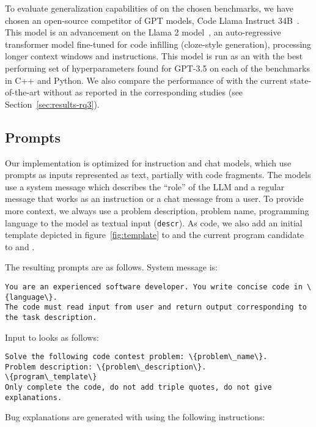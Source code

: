 To evaluate generalization capabilities of \method{} on the chosen benchmarks, we have chosen an open-source competitor of GPT models, Code Llama Instruct 34B~\cite{roziereCodeLlamaOpen2023}. 
This model is an advancement on the Llama 2 model~\cite{touvron2023:llama}, an auto-regressive transformer model fine-tuned for code infilling (cloze-style generation), processing longer context windows and instructions.
This model is run as an with the best performing set of hyperparameters found for GPT-3.5 on each of the benchmarks in C++ and Python.
We also compare the performance of \method{} with the current state-of-the-art without \method{} as reported in the corresponding studies (see Section~\ref{sec:results-rq3}).

\subsection{Prompts}
\label{sec:prompts}

Our implementation is optimized for instruction and chat models, which use prompts as inputs represented as text, partially with code fragments.
The models use a system message which describes the ``role'' of the LLM and a regular message that works as an instruction or a chat message from a user.
To provide more context, we always use a problem description, problem name, programming language to the model as textual input (\texttt{descr}). 
As code, we also add an initial template depicted in figure~\ref{fig:template} to \synthmodel{} and the current program candidate to \textmodel{} and \debugmodel{}.

The resulting prompts are as follows.
System message is: 

\begin{lstlisting}
You are an experienced software developer. You write concise code in \{language\}.
The code must read input from user and return output corresponding to the task description.
\end{lstlisting}

Input to \synthmodel{} looks as follows:

\begin{lstlisting}
Solve the following code contest problem: \{problem\_name\}. 
Problem description: \{problem\_description\}.
\{program\_template\}
Only complete the code, do not add triple quotes, do not give explanations.
\end{lstlisting}

Bug explanations are generated with \textmodel{} using the following instructions:


